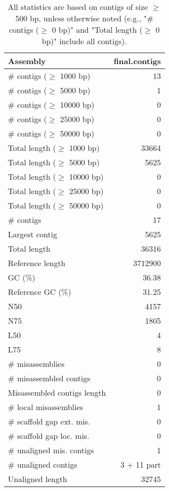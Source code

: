 \documentclass[12pt,a4paper]{article}
\begin{document}
\begin{table}[ht]
\begin{center}
\caption{All statistics are based on contigs of size $\geq$ 500 bp, unless otherwise noted (e.g., "\# contigs ($\geq$ 0 bp)" and "Total length ($\geq$ 0 bp)" include all contigs).}
\begin{tabular}{|l*{1}{|r}|}
\hline
Assembly & final.contigs \\ \hline
\# contigs ($\geq$ 1000 bp) & 13 \\ \hline
\# contigs ($\geq$ 5000 bp) & 1 \\ \hline
\# contigs ($\geq$ 10000 bp) & 0 \\ \hline
\# contigs ($\geq$ 25000 bp) & 0 \\ \hline
\# contigs ($\geq$ 50000 bp) & 0 \\ \hline
Total length ($\geq$ 1000 bp) & 33664 \\ \hline
Total length ($\geq$ 5000 bp) & 5625 \\ \hline
Total length ($\geq$ 10000 bp) & 0 \\ \hline
Total length ($\geq$ 25000 bp) & 0 \\ \hline
Total length ($\geq$ 50000 bp) & 0 \\ \hline
\# contigs & 17 \\ \hline
Largest contig & 5625 \\ \hline
Total length & 36316 \\ \hline
Reference length & 3712900 \\ \hline
GC (\%) & 36.38 \\ \hline
Reference GC (\%) & 31.25 \\ \hline
N50 & 4157 \\ \hline
N75 & 1805 \\ \hline
L50 & 4 \\ \hline
L75 & 8 \\ \hline
\# misassemblies & 0 \\ \hline
\# misassembled contigs & 0 \\ \hline
Misassembled contigs length & 0 \\ \hline
\# local misassemblies & 1 \\ \hline
\# scaffold gap ext. mis. & 0 \\ \hline
\# scaffold gap loc. mis. & 0 \\ \hline
\# unaligned mis. contigs & 1 \\ \hline
\# unaligned contigs & 3 + 11 part \\ \hline
Unaligned length & 32745 \\ \hline

\end{tabular}
\end{center}
\end{table}
\end{document}
